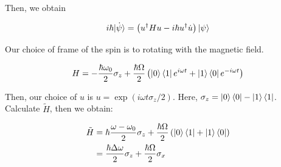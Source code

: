 \documentclass{article}
\newtheorem{one minute paper}[theorem]{One Minute Paper}
\begin{document}
Then, we obtain 

\begin{equation}
    i\hbar \dot{\ket{\psi}} = \left( u^{\dagger}Hu - i\hbar u^{\dagger}\dot{u} \right)\ket{\psi}
\end{equation}

Our choice of frame of the spin is to rotating with the magnetic field. 

\begin{equation}
    H = -\frac{\hbar \omega_0}{2}\sigma_z + \frac{\hbar\Omega}{2}\left( \ket{0}\bra{1}e^{i\omega t} + \ket{1}\bra{0}e^{-i\omega t} \right)
\end{equation}

Then, our choice of $u$ is $u = \exp(i\omega t\sigma_z/2)$. Here, $\sigma_z = \ket{0}\bra{0} - \ket{1}\bra{1}$. Calculate $\tilde{H}$, then we obtain:

\begin{align*}
    \tilde{H} &= \hbar \frac{\omega - \omega_0}{2}\sigma_z + \frac{\hbar \Omega}{2}\left( \ket{0}\bra{1} + \ket{1}\bra{0} \right) \\
    &= \frac{\hbar \Delta \omega}{2}\sigma_z + \frac{\hbar\Omega}{2}\sigma_x
\end{align*}
\end{document}
